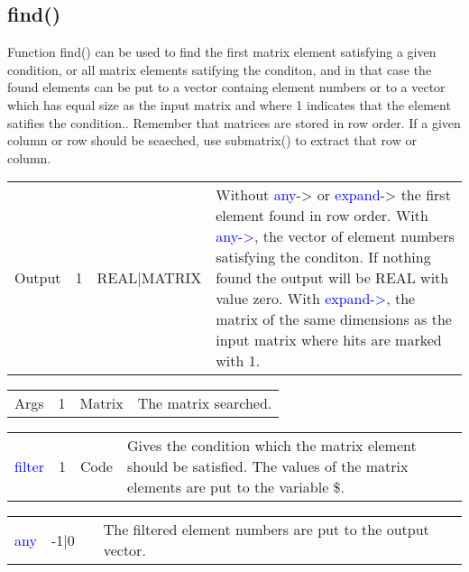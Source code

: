 \subsection{find()}
\label{find}
Function \textcolor{VioletRed}{find}() can be used to find the first matrix element satisfying a given condition, or
 all matrix elements satifying the conditon, and in that case the found
 elements can be put to a vector containg element numbers or to a
vector which has equal size as the input matrix and where 1 indicates that
 the element satifies the condition..
Remember that matrices are stored in row order. If a given column or row should be seaeched,
 use submatrix() to extract that row or column.
\begin{table}[H]
\begin{tabular}{ m{}  m{}m{}p{}}
Output& 1& REAL|MATRIX&Without \textcolor{blue}{any}-> or \textcolor{blue}{expand}-> the first element found in row order.
With \textcolor{blue}{any->}, the vector of element numbers satisfying the conditon. If nothing found
 the output will be REAL with value zero.
With \textcolor{blue}{expand->}, the matrix of the same dimensions as the input matrix where
 hits are marked with 1.
\\ \cline{1-4}
\end{tabular}
\end{table}
\vspace{-1.51em}
\begin{table}[H]
\begin{tabular}{ m{}  m{}m{}p{}}
Args&1&Matrix& The matrix searched.
\\ \cline{1-4}
\end{tabular}
\end{table}
\vspace{-1.51em}
\begin{table}[H]
\begin{tabular}{ m{}  m{}m{}p{}}
\textcolor{blue}{filter}&1&Code&Gives the condition which the matrix element should be satisfied. The
 values of the matrix elements are put to the variable \$.
\\ \cline{1-4}
\end{tabular}
\end{table}
\vspace{-1.51em}
\begin{table}[H]
\begin{tabular}{ m{}  m{}m{}p{}}
\textcolor{blue}{any}&-1|0& & The filtered element numbers are put to the output vector.
\\ \cline{1-4}
\end{tabular}
\end{table}
